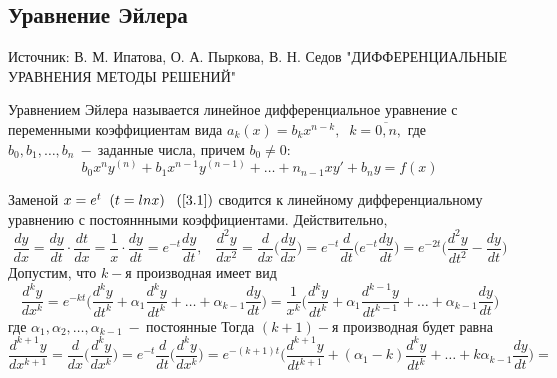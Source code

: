 \subsection{Уравнение Эйлера}
\begin{remark}
Источник: В. М. Ипатова, О. А. Пыркова, В. Н. Седов "ДИФФЕРЕНЦИАЛЬНЫЕ
УРАВНЕНИЯ
МЕТОДЫ РЕШЕНИЙ"
\end{remark}
\begin{definition}
Уравнением Эйлера называется линейное дифференциальное уравнение с переменными 
коэффициентам вида $a_k(x)=b_kx^{n-k},\;\;k=\overline{0,n},$ где $b_0,b_1,\dots,b_n~-~$заданные числа, причем $b_0\neq 0:$
\begin{equation}
\tag{3.1}
\label{3.1}
    b_0x^ny^{(n)}+b_1x^{n-1}y^{(n-1)}+\dots+n_{n-1}xy'+b_ny=f(x)
\end{equation}
\end{definition}
Заменой $x=e^t\;\;(t=ln x)\;\;\;(\ref{3.1})$ сводится к линейному дифференциальному уравнению с постояннными коэффициентами. Действительно, $$\frac{dy}{dx}=\frac{dy}{dt}\cdot\frac{dt}{dx}=\frac{1}{x}\cdot \frac{dy}{dt}=e^{-t}\frac{dy}{dt},\;\;\;\frac{d^2y}{dx^2}=\frac{d}{dx}\Big(\frac{dy}{dx}\Big)=e^{-t}\frac{d}{dt}\Big(e^{-t}\frac{dy}{dt}\Big)=e^{-2t}\Big(\frac{d^2y}{dt^2}-\frac{dy}{dt}\Big)$$
Допустим, что $k-$я производная имеет вид $$\frac{d^ky}{dx^k}=e^{-kt}\Big(\frac{d^ky}{dt^k}+\alpha_1\frac{d^ky}{dt^k}+\dots+\alpha_{k-1}\frac{dy}{dt}\Big)=\frac{1}{x^k}\Big(\frac{d^ky}{dt^k}+\alpha_1\frac{d^{k-1}y}{dt^{k-1}}+\dots+\alpha_{k-1}\frac{dy}{dt}\Big)$$ где $\alpha_1,\alpha_2,\dots,\alpha_{k-1}~-~\text{постоянные}$
Тогда $(k+1)-$я производная будет равна \begin{equation}
    \frac{d^{k+1}y}{dx^{k+1}}=\frac{d}{dx}\Big(\frac{d^ky}{dx^k}\Big)=e^{-t}\frac{d}{dt}\Big(\frac{d^ky}{dx^k}\Big)=e^{-(k+1)t}\Big(\frac{d^{k+1}y}{dt^{k+1}}+(\alpha_1-k)\frac{d^ky}{dt^k}+\dots+k\alpha_{k-1}\frac{dy}{dt}\Big) =
\end{equation}
    
